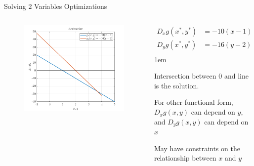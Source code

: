 \documentclass[11pt,aspectratio=43]{beamer}
\let\olditemize=\itemize
\let\endolditemize=\enditemize
\renewenvironment{itemize}{\olditemize \itemsep1em}{\endolditemize}
\theoremstyle{definition}
\begin{document}
\begin{frame}{Solving $2$ Variables Optimizations}
\label{slide:Solving__2__Variables_Optimizations}

    \begin{columns}
        \begin{column}{0.5\textwidth}
            \begin{figure}
                \includegraphics[width=\textwidth]{./figures/2VarOptimize.png}
            \end{figure}
        \end{column}
        \begin{column}{0.5\textwidth}
            \begin{equation*}
                  \begin{split}
                        D_{x} g( x^{*}, y^{*} )
                            & = -10( x-1 ) = 0
                        \\
                        D_{y} g( x^{*}, y^{*} )
                            & = -16( y-2 ) = 0
                        \\
                  \end{split}
            \end{equation*}
            \begin{itemize}
                \item \alert{Intersection} between $ 0 $ and line is the solution.
                \item For other functional form, $ D_{x} g( x, y ) $ can depend on $ y $, and $ D_{y}g( x, y ) $ can depend on $ x $
                \item May have constraints on the relationship between $ x $ and $ y $
            \end{itemize}
        \end{column}
    \end{columns}
\end{frame}
\end{document}
